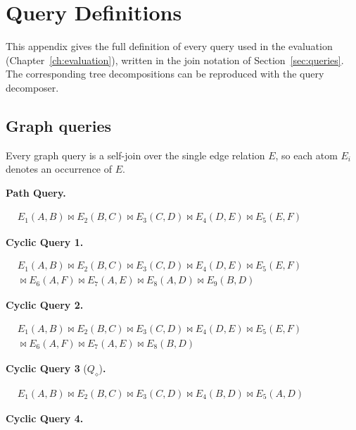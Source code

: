 \chapter{Query Definitions}
\label{app:queries}

This appendix gives the full definition of every query used in the evaluation (Chapter~\ref{ch:evaluation}), written in the join notation of Section~\ref{sec:queries}. The corresponding tree decompositions can be reproduced with the query decomposer.

\section{Graph queries}
\label{app:queries_graph}

Every graph query is a self-join over the single edge relation $E$, so each atom $E_i$ denotes an occurrence of $E$.

\medskip
\noindent\textbf{Path Query.}

\noindent$\displaystyle
\begin{aligned}
& E_1(A,B) \bowtie E_2(B,C) \bowtie E_3(C,D) \bowtie E_4(D,E) \bowtie E_5(E,F)
\end{aligned}$

\medskip
\noindent\textbf{Cyclic Query 1.}

\noindent$\displaystyle
\begin{aligned}
& E_1(A,B) \bowtie E_2(B,C) \bowtie E_3(C,D) \bowtie E_4(D,E) \bowtie E_5(E,F) \\
& {} \bowtie E_6(A,F) \bowtie E_7(A,E) \bowtie E_8(A,D) \bowtie E_9(B,D)
\end{aligned}$

\medskip
\noindent\textbf{Cyclic Query 2.}

\noindent$\displaystyle
\begin{aligned}
& E_1(A,B) \bowtie E_2(B,C) \bowtie E_3(C,D) \bowtie E_4(D,E) \bowtie E_5(E,F) \\
& {} \bowtie E_6(A,F) \bowtie E_7(A,E) \bowtie E_8(B,D)
\end{aligned}$

\medskip
\noindent\textbf{Cyclic Query 3} ($Q_\diamond$)\textbf{.}

\noindent$\displaystyle
\begin{aligned}
& E_1(A,B) \bowtie E_2(B,C) \bowtie E_3(C,D) \bowtie E_4(B,D) \bowtie E_5(A,D)
\end{aligned}$

\medskip
\noindent\textbf{Cyclic Query 4.}


